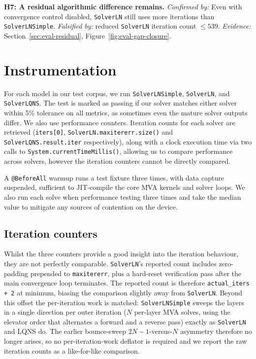 \textbf{H7: A residual algorithmic difference remains.} \textit{Confirmed by:} Even with convergence control disabled, \texttt{SolverLN} still uses more iterations than \texttt{SolverLNSimple}. \textit{Falsified by:} reduced \texttt{SolverLN} iteration count $\leq 539$. \textit{Evidence:} Section~\ref{sec:eval-residual}, Figure~\ref{fig:eval-gap-closure}.







\section{Instrumentation}
\label{sec:contrib-instrumentation}

For each model in our test corpus, we run \texttt{SolverLNSimple}, \texttt{SolverLN}, and \texttt{SolverLQNS}. The test is marked as passing if our solver matches either solver within 5\% tolerance on all metrics, as sometimes even the mature solver outputs differ. We also use performance counters. Iteration counts for each solver are retrieved (\texttt{iters[0]}, \texttt{SolverLN.maxitererr.size()} and \texttt{SolverLQNS.result.iter} respectively), along with a clock execution time via two calls to \texttt{System.currentTimeMillis()}, allowing us to compare performance across solvers, however the iteration counters cannot be directly compared.

A \texttt{@BeforeAll} warmup runs a test fixture three times, with data capture suspended, sufficient to JIT-compile the core MVA kernels and solver loops. We also run each solve when performance testing three times and take the median value to mitigate any sources of contention on the device.

\subsection{Iteration counters}
\label{sec:eval-iteration-counters}

Whilst the three counters provide a good insight into the iteration behaviour, they are not perfectly comparable. \texttt{SolverLN}'s reported count includes zero-padding prepended to \texttt{maxitererr}, plus a hard-reset verification pass after the main convergence loop terminates. The reported count is therefore \texttt{actual\_iters + 2} at minimum, biasing the comparison slightly away from \texttt{SolverLN}. Beyond this offset the per-iteration work is matched: \texttt{SolverLNSimple} sweeps the layers in a single direction per outer iteration ($N$ per-layer MVA solves, using the elevator order that alternates a forward and a reverse pass) exactly as \texttt{SolverLN} and LQNS do. The earlier bounce-sweep $2N{-}1$-versus-$N$ asymmetry therefore no longer arises, so no per-iteration-work deflator is required and we report the raw iteration counts as a like-for-like comparison.

